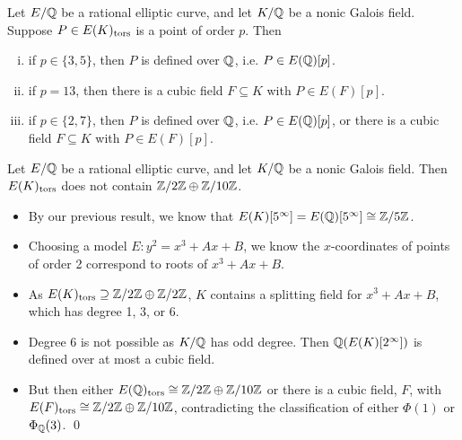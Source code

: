 \begin{frame}[plain]
\begin{prop}
Let $E/\mathbb{Q}$ be a rational elliptic curve, and let $K/\mathbb{Q}$ be a nonic Galois field. Suppose $P \in E(K)_{\text{tors}}$ is a point of order $p$. Then
        \begin{enumerate}[(i)]
        \item if $p \in \{ 3, 5 \}$, then $P$ is defined over $\mathbb{Q}$, i.e. $P \in E(\mathbb{Q})[p]$.
        \item if $p= 13$, then there is a cubic field $F \subseteq K$ with $P \in E(F)[p]$. 
        \item if $p \in \{ 2, 7 \}$, then $P$ is defined over $\mathbb{Q}$, i.e. $P \in E(\mathbb{Q})[p]$, or there is a cubic field $F \subseteq K$ with $P \in E(F)[p]$. 
        \end{enumerate}
\end{prop}
\end{frame}



\begin{frame}[plain]
\footnotesize
\begin{lem}
Let $E/\mathbb{Q}$ be a rational elliptic curve, and let $K/\mathbb{Q}$ be a nonic Galois field. Then $E(K)_{\text{tors}}$ does not contain $\mathbb{Z}/2\mathbb{Z} \oplus \mathbb{Z}/10\mathbb{Z}$.
\end{lem} \pspace

\pf
\begin{itemize}
\item By our previous result, we know that $E(K)[5^\infty]= E(\mathbb{Q})[5^\infty] \cong \mathbb{Z}/5\mathbb{Z}$. 
\item Choosing a model $E: y^2= x^3 + Ax + B$, we know the $x$-coordinates of points of order 2 correspond to roots of $x^3 + Ax + B$. 
\item As $E(K)_{\text{tors}} \supseteq \mathbb{Z}/2\mathbb{Z} \oplus \mathbb{Z}/2\mathbb{Z}$, $K$ contains a splitting field for $x^3 + Ax + B$, which has degree 1, 3, or 6. 
\item Degree 6 is not possible as $K/\mathbb{Q}$ has odd degree. Then $\mathbb{Q}(E(K)[2^\infty])$ is defined over at most a cubic field. 
\item But then either $E(\mathbb{Q})_{\text{tors}} \cong \mathbb{Z}/2\mathbb{Z} \oplus \mathbb{Z}/10\mathbb{Z}$ or there is a cubic field, $F$, with $E(F)_{\text{tors}} \cong \mathbb{Z}/2\mathbb{Z} \oplus \mathbb{Z}/10\mathbb{Z}$, contradicting the classification of either $\Phi(1)$ or $\Phi_{\mathbb{Q}}(3)$. \hfill\qed
\end{itemize}
\end{frame}



